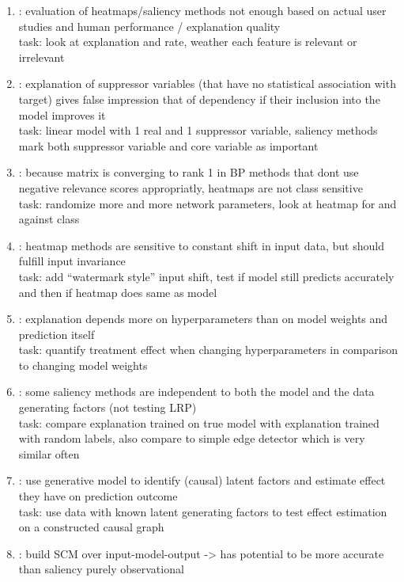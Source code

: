 \begin{enumerate}
      \item \cite{Sixt2022a}: evaluation of heatmaps/saliency methods not enough based on actual user studies and human performance / explanation quality
            \\ task: look at explanation and rate, weather each feature is relevant or irrelevant
      \item \cite{Wilming2023}: explanation of suppressor variables (that have no statistical association with target) gives false impression that of dependency if their inclusion into the model improves it
            \\ task: linear model with 1 real and 1 suppressor variable, saliency methods mark both suppressor variable and core variable as important
      \item \cite{Sixt2020}: because matrix is converging to rank 1 in BP methods that dont use negative relevance scores appropriatly, heatmaps are not class sensitive
            \\ task: randomize more and more network parameters, look at heatmap for and against class
      \item \cite{Kindermans2019}: heatmap methods are sensitive to constant shift in input data, but should fulfill input invariance
            \\ task: add “watermark style” input shift, test if model still predicts accurately and then if heatmap does same as model
      \item \cite{Karimi2023}: explanation depends more on hyperparameters than on model weights and prediction itself
            \\ task: quantify treatment effect when changing hyperparameters in comparison to changing model weights
      \item \cite{Adebayo2018}: some saliency methods are independent to both the model and the data generating factors (not testing LRP)
            \\ task: compare explanation trained on true model with explanation trained with random labels, also compare to simple edge detector which is very similar often
      \item \cite{Parafita2019}: use generative model to identify (causal) latent factors and estimate effect they have on prediction outcome
            \\ task: use data with known latent generating factors to test effect estimation on a constructed causal graph
      \item \cite{Narendra2018}: build SCM over input-model-output -> has potential to be more accurate than saliency purely observational

\end{enumerate}
